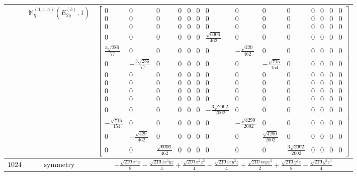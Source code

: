 \documentclass[fleqn,8pt,landscape]{jsarticle}
\begin{document}
\begin{longtable}{ccc}
$  $ & $ \mathbb{M}_{5}^{(1,1;a)}(E_{2g}^{(b)},1) $ & $ \begin{bmatrix} 0 & 0 & 0 & 0 & 0 & 0 & 0 & 0 & 0 & 0 & 0 & 0 & 0 & 0 \\ 0 & 0 & 0 & 0 & 0 & 0 & 0 & 0 & 0 & 0 & 0 & 0 & 0 & 0 \\ 0 & 0 & 0 & 0 & 0 & 0 & 0 & 0 & 0 & 0 & 0 & 0 & 0 & 0 \\ 0 & 0 & 0 & 0 & 0 & 0 & \frac{\sqrt{6006}}{462} & 0 & 0 & 0 & 0 & 0 & 0 & 0 \\ \frac{3 \sqrt{286}}{77} & 0 & 0 & 0 & 0 & 0 & 0 & - \frac{\sqrt{429}}{462} & 0 & 0 & 0 & 0 & 0 & 0 \\ 0 & - \frac{3 \sqrt{286}}{77} & 0 & 0 & 0 & 0 & 0 & 0 & - \frac{\sqrt{715}}{154} & 0 & 0 & 0 & 0 & 0 \\ 0 & 0 & 0 & 0 & 0 & 0 & 0 & 0 & 0 & 0 & 0 & 0 & 0 & 0 \\ 0 & 0 & 0 & 0 & 0 & 0 & 0 & 0 & 0 & 0 & 0 & 0 & 0 & 0 \\ 0 & 0 & 0 & 0 & 0 & 0 & 0 & 0 & 0 & 0 & 0 & 0 & 0 & 0 \\ 0 & 0 & 0 & 0 & 0 & 0 & 0 & 0 & 0 & 0 & 0 & 0 & 0 & 0 \\ 0 & 0 & 0 & 0 & 0 & 0 & - \frac{3 \sqrt{2002}}{2002} & 0 & 0 & 0 & 0 & 0 & 0 & 0 \\ - \frac{\sqrt{715}}{154} & 0 & 0 & 0 & 0 & 0 & 0 & - \frac{\sqrt{4290}}{2002} & 0 & 0 & 0 & 0 & 0 & 0 \\ 0 & - \frac{\sqrt{429}}{462} & 0 & 0 & 0 & 0 & 0 & 0 & \frac{\sqrt{4290}}{2002} & 0 & 0 & 0 & 0 & 0 \\ 0 & 0 & \frac{\sqrt{6006}}{462} & 0 & 0 & 0 & 0 & 0 & 0 & \frac{3 \sqrt{2002}}{2002} & 0 & 0 & 0 & 0 \end{bmatrix} $ \\ \hline
$ 1024 $ & $ \text{symmetry} $ & $ - \frac{\sqrt{210} x^{4} z}{8} - \frac{\sqrt{210} i x^{3} y z}{4} + \frac{\sqrt{210} x^{2} z^{3}}{4} - \frac{\sqrt{210} i x y^{3} z}{4} + \frac{\sqrt{210} i x y z^{3}}{2} + \frac{\sqrt{210} y^{4} z}{8} - \frac{\sqrt{210} y^{2} z^{3}}{4} $ \\

\end{longtable}
\end{document}
